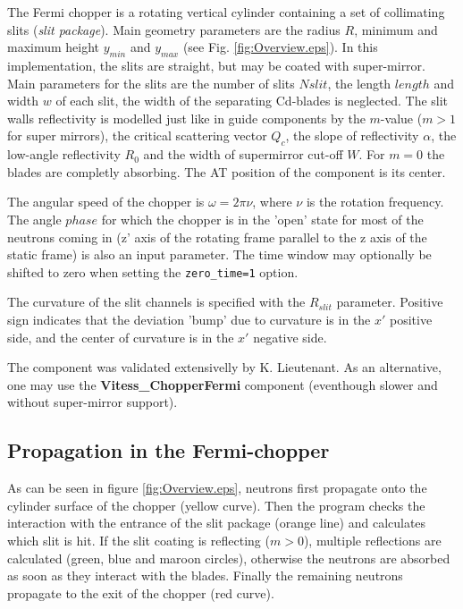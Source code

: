 The Fermi chopper is a rotating vertical cylinder containing a set of collimating slits (\emph{slit package}). Main geometry parameters are the radius $R$, minimum and maximum height $y_{min}$ and $y_{max}$ (see Fig. \ref{fig:Overview.eps}).
In this implementation, the slits are straight, but may be coated with super-mirror. Main parameters for the slits are the number of slits $Nslit$, the length $length$ and width $w$ of each slit, the width of the separating Cd-blades is neglected. The slit walls reflectivity is modelled just like in guide components by the $m$-value ($m > 1$ for super mirrors), the critical scattering vector $Q_c$, the slope of reflectivity $\alpha$, the low-angle reflectivity $R_0$ and the width of supermirror cut-off $W$. For $m=0$ the blades are completly absorbing. The AT position of the component is its center.

The angular speed of the chopper is $\omega = 2\pi \nu$, where $\nu$ is the rotation frequency. The angle $phase$ for which the chopper is in the 'open' state for most of the neutrons coming in (z' axis of the rotating frame parallel to the z axis of the static frame) is also an input parameter. The time window may optionally be shifted to zero when setting the \verb+zero_time=1+ option.

The curvature of the slit channels is specified with the $R_{slit}$ parameter. Positive sign indicates that the deviation 'bump' due to curvature is in the $x'$ positive side, and the center of curvature is in the $x'$ negative side.

The component was validated extensivelly by K. Lieutenant. As an alternative, one may use the {\bf Vitess\_ChopperFermi} component (eventhough slower and without super-mirror support).

\subsection{Propagation in the Fermi-chopper}

As can be seen in figure \ref{fig:Overview.eps}, neutrons first propagate onto the cylinder surface of the chopper (yellow curve). Then the program checks the interaction with the entrance of the slit package (orange line) and calculates which slit is hit. If the slit coating is reflecting ($m > 0$), multiple reflections are calculated (green, blue and maroon circles), otherwise the neutrons are absorbed as soon as they interact with the blades. Finally the remaining neutrons propagate to the exit of the chopper (red curve).

